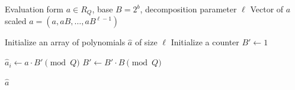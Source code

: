 \begin{algorithm}
\caption{Powers of Base}
\label{alg:powers-of-base}
\begin{algorithmic}[1]
\Require Evaluation form $a \in R_Q$, base $B = 2^b$, decomposition parameter $\ell$
\Ensure Vector of $a$ scaled $\hat{a} = (a, a B, \dots, aB^{\ell-1})$

\State Initialize an array of polynomials $\hat{a}$ of size $\ell$
\State Initialize a counter $B' \leftarrow 1$ 

    \State $\hat{a}_i \leftarrow a \cdot B' \pmod{Q}$ 
    \State $B' \leftarrow B' \cdot B \pmod{Q}$ 
\EndFor

\State \Return $\hat{a}$
\end{algorithmic}
\end{algorithm}